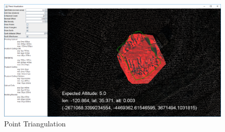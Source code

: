 \begin{figure}[htp]
\begin{center}
  \includegraphics[width=.75\linewidth]{images/triangulation.png}
  \caption{Point Triangulation}
  \label{fig:triangulation}
\end{center}
\end{figure}